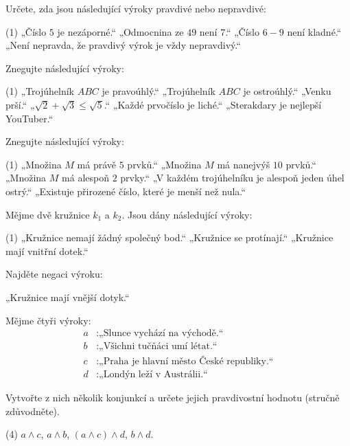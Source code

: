 \documentclass[12pt,a4paper]{article}
\begin{document}
\begin{exercise}
Určete, zda jsou následující výroky pravdivé nebo nepravdivé:
\begin{tasks}(1)
\task „Číslo $5$ je nezáporné.“  
\task „Odmocnina ze $49$ není $7$.“  
\task „Číslo $6-9$ není kladné.“  
\task „Není nepravda, že pravdivý výrok je vždy nepravdivý.“  
\end{tasks}
\end{exercise}

\begin{exercise}
Znegujte následující výroky:
\begin{tasks}(1)
\task „Trojúhelník $ABC$ je pravoúhlý.“  
\task „Trojúhelník $ABC$ je ostroúhlý.“  
\task „Venku prší.“  
\task „$\sqrt{2} + \sqrt{3} \leq \sqrt{5}$.“  
\task „Každé prvočíslo je liché.“  
\task „Sterakdary je nejlepší YouTuber.“
\end{tasks}
\end{exercise}

\begin{exercise}
Znegujte následující výroky:
\begin{tasks}(1)
\task „Množina $M$ má právě $5$ prvků.“  
\task „Množina $M$ má nanejvýš $10$ prvků.“  
\task „Množina $M$ má alespoň $2$ prvky.“  
\task „V každém trojúhelníku je alespoň jeden úhel ostrý.“  
\task „Existuje přirozené číslo, které je menší než nula.“  
\end{tasks}
\end{exercise}

\newpage

\begin{exercise}
Mějme dvě kružnice $k_1$ a $k_2$. Jsou dány následující výroky:
\begin{tasks}(1)
\task „Kružnice nemají žádný společný bod.“  
\task „Kružnice se protínají.“  
\task „Kružnice mají vnitřní dotek.“  
\end{tasks}

Najděte negaci výroku:  
\begin{center}
„Kružnice mají vnější dotyk.“
\end{center}
\end{exercise}

\begin{exercise}
Mějme čtyři výroky:
\[
\begin{aligned}
a &: \text{„Slunce vychází na východě.“}\\
b &: \text{„Všichni tučňáci umí létat.“}\\
c &: \text{„Praha je hlavní město České republiky.“}\\
d &: \text{„Londýn leží v Austrálii.“}
\end{aligned}
\]

Vytvořte z nich několik konjunkcí a určete jejich pravdivostní hodnotu (stručně zdůvodněte).
\begin{tasks}(4)
\task $a \land c$,
\task $a \land b$,
\task $(a \land c) \land d$,
\task $b \land d$.
\end{tasks}
\end{exercise}
\end{document}
